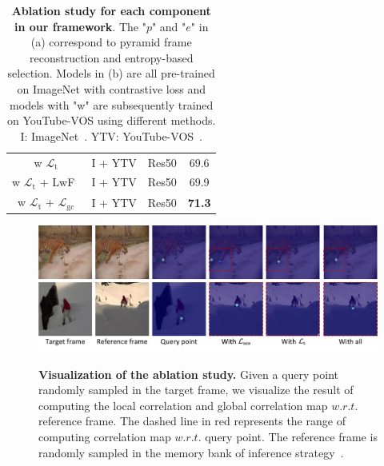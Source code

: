 \documentclass{article}
\begin{document}
\begin{table}[t]
{{\begin{tabular}{@{}cccc@{}}
            w $\mathcal{L}_{\mathrm{t}}$    & I + YTV & Res50 &69.6          \\
            w $\mathcal{L}_{\mathrm{t}}$ + LwF~\cite{li2017learning}            & I + YTV & Res50 &69.9          \\
            w $\mathcal{L}_{\mathrm{t}}$ + $\mathcal{L}_{\mathrm{gc}}$ & I + YTV & Res50 &\textbf{71.3} \\
            \hline
            \end{tabular}%
            }
          }
    \captionsetup{font=small}
    \caption{\textbf{Ablation study for each component in our framework}.  The "$p$" and "$e$" in (a) correspond to pyramid frame reconstruction and entropy-based selection. Models in (b) are all pre-trained on ImageNet with contrastive loss and models with "w" are subsequently trained on YouTube-VOS using different methods. I: ImageNet~\cite{deng2009large}.  YTV: YouTube-VOS~\cite{xu2018youtube}.}
    \label{tab:ablations}\vspace{-2mm}
\end{table}

\begin{figure}[!tb]
  \centering
  {\includegraphics[width=1.0\textwidth]{figure/abalations/ablataions.pdf}}
  \caption{\small \textbf{Visualization of the ablation study.} Given a query point randomly sampled in the target frame, we visualize the result of computing the local correlation and global correlation map $w.r.t.$ reference frame. The dashed line in red represents the range of computing correlation map $w.r.t.$ query point. The reference frame is randomly sampled in the memory bank of inference strategy~\cite{jabri2020space}\cite{lai2020mast}\cite{xu2021rethinking}. }
  \label{fig:ablations}
  \vspace{-7mm}
\end{figure}
\end{document}
